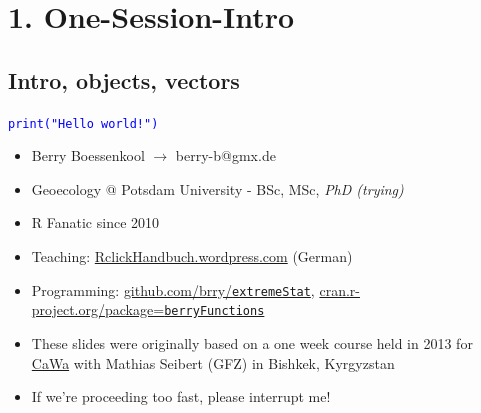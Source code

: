 \documentclass[xcolor=table,           xcolor=dvipsnames]{beamer}\usepackage[]{graphicx}\usepackage[]{color}
\newcommand{\rcode}[1]{\texttt{\textcolor{Blue}{#1}}} %
\begin{document}
\section{1. One-Session-Intro}

\subsection{Intro, objects, vectors}

\begin{frame}{\rcode{print("Hello world!")}}
\begin{itemize}[<+->]
\item Berry Boessenkool $\rightarrow$ berry-b@gmx.de
\item Geoecology @ Potsdam University \onslide<+-> - BSc\onslide<+->, MSc\onslide<+->, \textit{PhD (trying)}
\item R Fan\onslide<+->atic \onslide<+-> since 2010
\item Teaching: \href{https://rclickhandbuch.wordpress.com}{RclickHandbuch.wordpress.com} (German)
\item Programming: \href{https://github.com/brry}{github.com/brry/\texttt{extremeStat}}, \onslide<+->\href{https://cran.r-project.org/package=berryFunctions}{cran.r-project.org/package=\texttt{berryFunctions}}
\item These slides were originally based on a one week course held in 2013 for \href{http://www.cawa-project.net/story/300}{CaWa} with Mathias Seibert (GFZ) in Bishkek, Kyrgyzstan
\item \alert{If we're proceeding too fast, please interrupt me!}
\end{itemize}
\end{frame}

\end{document}
